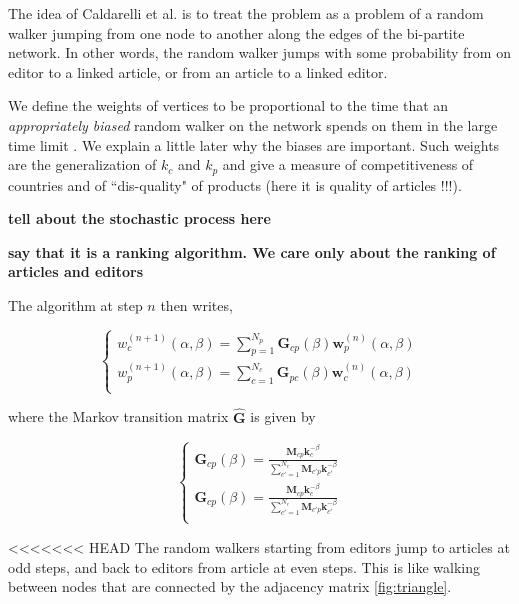 The idea of Caldarelli et al. \cite{caldarelli2012network} is to treat the problem as a problem of a random walker jumping from one node to another along the edges of the bi-partite network. In other words, the random walker jumps with some probability from on editor to a linked article, or from an article to a linked editor. 

We define the weights of vertices to be proportional to the time that an {\it appropriately biased} random walker on the network spends on them in the large time limit \cite{zlatic2010}. We explain a little later why the biases are important. Such weights are the generalization of $k_c$ and $k_p$ and give a measure of competitiveness of countries and of ``dis-quality" of products (here it is quality of articles !!!).


{\bf tell about the stochastic process here} \cite{caldarelli2012network}

{\bf say that it is a ranking algorithm. We care only about the ranking of articles and editors}

The algorithm at step $n$ then writes,

\begin{equation}
\begin{cases}
 w^{(n+1)}_c (\alpha,\beta) = \sum_{p=1}^{N_p}  \mathbf{G}_{cp}(\beta) \mathbf{w}^{(n)}_p (\alpha,\beta)\\
w^{(n+1)}_p (\alpha,\beta) = \sum_{c=1}^{N_c}  \mathbf{G}_{pc}(\beta) \mathbf{w}^{(n)}_c (\alpha,\beta)\\
\end{cases}
\end{equation}

where the Markov transition matrix $\mathbf{\hat{G}}$ is given by 

\begin{equation}
\begin{cases}
\mathbf{G}_{cp}(\beta) = \frac{\mathbf{M}_{cp} \mathbf{k}_{c}^{-\beta}}{\sum_{c' = 1}^{N_c} \mathbf{M}_{c'p} \mathbf{k}_{c'}^{-\beta}}\\
\mathbf{G}_{cp}(\beta) = \frac{\mathbf{M}_{cp} \mathbf{k}_{c}^{-\beta}}{\sum_{c' = 1}^{N_c} \mathbf{M}_{c'p} \mathbf{k}_{c'}^{-\beta}}\\
 \end{cases}
\end{equation}

<<<<<<< HEAD
The random walkers starting from editors jump to articles at odd steps, and back to editors from article at even steps. This is like walking between nodes that are connected by the adjacency matrix \ref{fig:triangle}.



